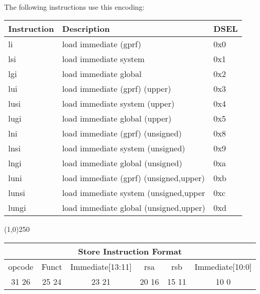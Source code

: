 \documentclass[letterpaper, 11pt]{article}
\begin{document}
\paragraph{}The following instructions use this encoding: \\
\begin{center}
	\begin{tabular}{|l|l|l|} \hline
			Instruction & Description 								& DSEL\\ \hline
			li			& load immediate (gprf)						& 0x0 \\ \hline
			lsi			& load immediate system						& 0x1 \\ \hline
			lgi			& load immediate global						& 0x2 \\ \hline
			lui			& load immediate (gprf)	(upper)				& 0x3 \\ \hline
			lusi		& load immediate system	(upper)				& 0x4 \\ \hline
			lugi		& load immediate global	(upper)				& 0x5 \\ \hline
			lni			& load immediate (gprf)	(unsigned)			& 0x8 \\ \hline
			lnsi		& load immediate system	(unsigned)			& 0x9 \\ \hline
			lngi		& load immediate global	(unsigned)			& 0xa \\ \hline 
			luni		& load immediate (gprf) (unsigned,upper)	& 0xb \\ \hline
			lunsi		& load immediate system	(unsigned,upper		& 0xc \\ \hline
			lungi		& load immediate global	(unsigned,upper)	& 0xd \\ \hline

\end{tabular}
\end{center}
\begin{center}
	\line(1,0){250}
\end{center}


\begin{center}
		\begin{tabular}{|c|c|c|c|c|c|}
			\multicolumn{6}{c}{Store Instruction Format}\\ \hline
				\hspace{2pt} opcode \hspace{2pt} & \hspace{5pt} Funct \hspace{5pt} &  \hspace{4pt} Immediate[13:11] \hspace{4pt} & \hspace{4pt}rsa  \hspace{4pt} & \hspace{4pt}rsb  \hspace{4pt} &\hspace{10pt}Immediate[10:0]  \hspace{10pt}     \\	\hline
				31 \hfill 26& 25 \hfill 24 &23 \hfill 21 &20 \hfill  16& 15 \hfill  11&10 \hfill  0\\ \hline
		
	\end{tabular}
\end{center}
\end{document}
